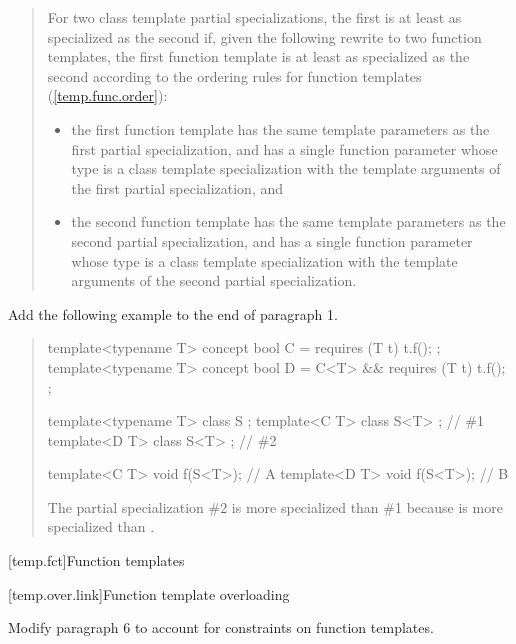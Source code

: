 \begin{quote}
\pnum
For two class template partial specializations, the first is 
at least as specialized as the second if, given the following 
rewrite to two function templates, the first function template 
is at least as specialized as the second according to the ordering 
rules for function templates 
(\ref{temp.func.order}):
% 
\begin{itemize}
\item the first function template has the same template 
parameters  
as the first partial specialization, and has a single function parameter 
whose type is a class template specialization with the template
arguments of the first partial specialization, and

\item the second function template has the same template 
parameters  
as the second partial specialization, and has a single function parameter 
whose type is a class template specialization with the template
arguments of the second partial specialization.
\end{itemize}
\end{quote}

Add the following example to the end of paragraph 1.

\begin{quote}
\begin{addedblock}
\enterexample
\begin{codeblock}
template<typename T> concept bool C = requires (T t) { t.f(); };
template<typename T> concept bool D = C<T> && requires (T t) { t.f(); };


template<typename T> class S { };
template<C T> class S<T> { }; // \#1
template<D T> class S<T> { }; // \#2

template<C T> void f(S<T>); // A
template<D T> void f(S<T>); // B
\end{codeblock}
The partial specialization \#2 is more specialized than 
\#1 because  is more specialized than .
\exitexample
\end{addedblock}
\end{quote}


[temp.fct]{Function templates}

[temp.over.link]{Function template overloading}

Modify paragraph 6 to account for constraints on function templates.

